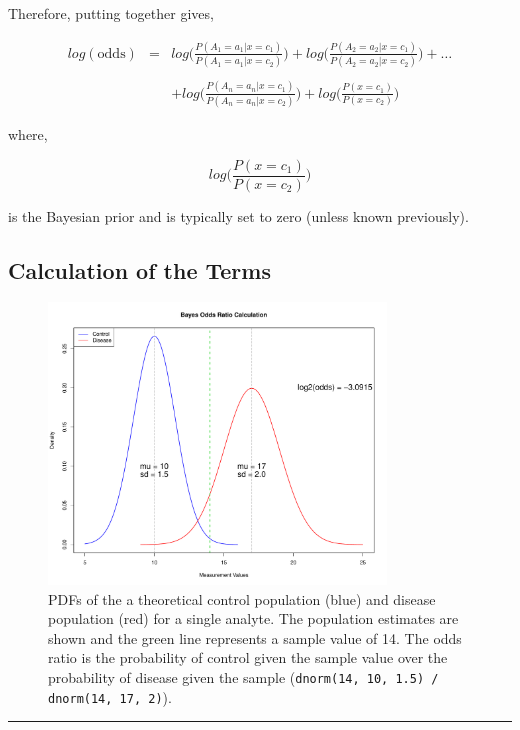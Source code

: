 \documentclass[12pt]{article}
\newcommand{\code}[1]{\texttt{#1}}                      %
\begin{document}
\newpage

Therefore, putting together gives,

\begin{eqnarray*}
	log(\text{odds}) &=& log\Bigg(\frac{P(A_1=a_1|x=c_1)}{P(A_1=a_1|x=c_2)}\Bigg) + 
			log\Bigg(\frac{P(A_2=a_2|x=c_1)}{P(A_2=a_2|x=c_2)}\Bigg) + \dots \\ \\
			&& + log\Bigg(\frac{P(A_n=a_n|x=c_1)}{P(A_n=a_n|x=c_2)}\Bigg) + 
			log\bigg(\frac{P(x=c_1)}{P(x=c_2)}\bigg)
\end{eqnarray*}


where,

\begin{equation*}
			log\bigg(\frac{P(x=c_1)}{P(x=c_2)}\bigg)
\end{equation*}

is the Bayesian prior and is typically set to zero (unless known previously).


\subsection{Calculation of the Terms}

\begin{figure}[H]
	\centering
	\includegraphics[width=0.8\textwidth]{plots/bayes_distn.pdf}
  \caption{PDFs of the a theoretical control population (blue) and disease population (red) for a single analyte. The population estimates are shown and the green line represents a sample value of 14. The odds ratio is the probability of control given the sample value over the probability of disease given the sample (\code{dnorm(14, 10, 1.5) / dnorm(14, 17, 2)}).}
\end{figure}


\def \hzline{\rule[0mm]{\textwidth}{1pt}}
\vfill \noindent \hzline \\ 
\end{document}
